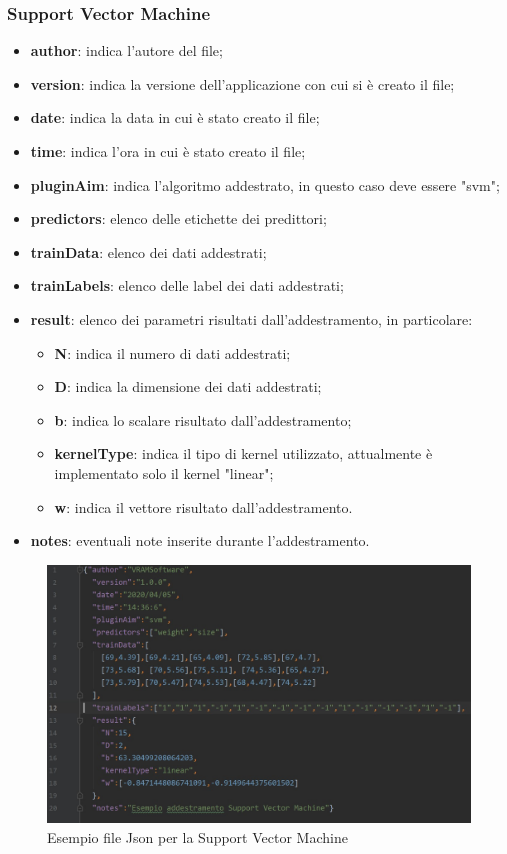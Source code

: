 		\subsubsection{Support Vector Machine}
			\begin{itemize}
				\item \textbf{author}: indica l'autore del file;
				\item \textbf{version}: indica la versione dell'applicazione con cui si è creato il file;
				\item \textbf{date}: indica la data in cui è stato creato il file;
				\item \textbf{time}: indica l'ora in cui è stato creato il file;
				\item \textbf{pluginAim}: indica l'algoritmo addestrato, in questo caso deve essere "svm";
				\item \textbf{predictors}: elenco delle etichette dei predittori;
				\item \textbf{trainData}: elenco dei dati addestrati;
				\item \textbf{trainLabels}: elenco delle label dei dati addestrati;
				\item \textbf{result}: elenco dei parametri risultati dall'addestramento, in particolare:
				\begin{itemize}
					\item \textbf{N}: indica il numero di dati addestrati;
					\item \textbf{D}: indica la dimensione dei dati addestrati;
					\item \textbf{b}: indica lo scalare risultato dall'addestramento;
					\item \textbf{kernelType}: indica il tipo di kernel utilizzato, attualmente è implementato solo il kernel "linear";
					\item \textbf{w}: indica il vettore risultato dall'addestramento.
				\end{itemize}
				\item \textbf{notes}: eventuali note inserite durante l'addestramento.
			\end{itemize}
		\mbox{}
		\begin{figure} [H]
			\begin{center}
				\includegraphics[width=\linewidth]{./img/jsonSvm.jpg}
			\end{center}
			\caption{Esempio file Json per la Support Vector Machine}
		\end{figure}
